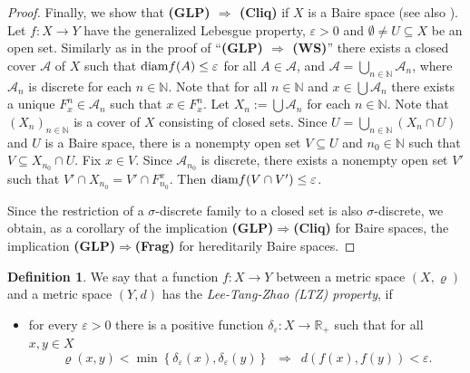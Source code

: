 \documentclass[a4paper]{amsart}
\theoremstyle{plain}
\theoremstyle{definition}
\newtheorem{definition}[theorem]{Definition}
\theoremstyle{remark}
\numberwithin{equation}{section}
\begin{document}
\begin{proof}
  	Finally, we show that {\bf (GLP) $\Rightarrow$ (Cliq)} if $X$ is a Baire space (see also \cite[proof of Theorem 3.8]{H}).  
  	Let $f\colon X\to Y$ have the generalized Lebesgue property, $\varepsilon>0$ and $\emptyset\ne U\subseteq X$ be an open set. 
  	Similarly as in the proof of ``{\bf (GLP) $\Rightarrow$ (WS)}'' there exists a closed cover $\mathcal{A}$ of $X$ 
 	such that ${\rm diam}f(A)\le\varepsilon$ for all $A\in\mathcal{A}$, and $\mathcal{A}=\bigcup_{n\in\mathbb{N}}\mathcal{A}_n$, 
 	where $\mathcal{A}_n$ is discrete for each $n\in\mathbb{N}$. 	
 	Note that for all $n\in\mathbb{N}$ and 
    $x\in\bigcup\mathcal{A}_n$ there exists a unique $F^n_x\in\mathcal{A}_n$ such that $x\in F^n_x$.
 	Let $X_n:=\bigcup\mathcal{A}_n$ for each $n\in\mathbb{N}$.
  	Note that $(X_n)_{n\in\mathbb N}$ is a cover of $X$ consisting of closed sets. 
  	Since $U=\bigcup_{n\in\mathbb{N}} (X_n\cap U)$ and $U$ is a Baire space, there is a nonempty open set $V\subseteq U$ and $n_0\in\mathbb N$ 
  	such that $V\subseteq X_{n_0}\cap U$. 
  	Fix $x\in V$. Since $\mathcal{A}_{n_0}$ is discrete, there exists a nonempty open set $V'$ such that $V'\cap X_{n_0}=V'\cap F^x_{n_0}$.
  	Then ${\rm diam} f(V\cap V')\le\varepsilon$.

    Since the restriction of a $\sigma$-discrete family to a closed set is also $\sigma$-discrete, we obtain, as a corollary of the implication {\bf (GLP)$\Rightarrow$(Cliq)} for Baire spaces, the implication {\bf (GLP)$\Rightarrow$(Frag)} for hereditarily Baire spaces.
 \end{proof}
 
  
 
 
 \begin{definition}
 	We say that a function $f\colon X\to Y$ between a metric space $(X,\varrho)$ and a metric space $(Y,d)$ has the \emph{Lee-Tang-Zhao (LTZ) property}, if 
	\begin{itemize}
		\item[{\rm (LTZ)}] for every $\varepsilon>0$ there is a positive function $\delta_\varepsilon\colon X\to\mathbb R_+$ such that for all $x,y\in X$
		\begin{equation*} 
			\varrho(x,y)<\min\left\{\delta_\varepsilon(x),\delta_\varepsilon(y)\right\} \,\,\,\Longrightarrow\,\,\,  d(f(x),f(y))<\varepsilon.
		\end{equation*}
	\end{itemize}
 \end{definition}
 
\end{document}
